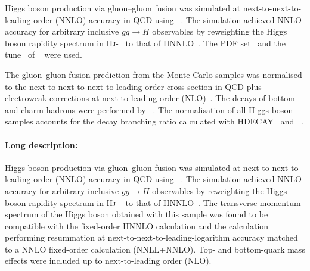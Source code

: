 Higgs boson production via gluon--gluon fusion was simulated at next-to-next-to-leading-order (NNLO) accuracy in 
QCD using \POWHEGBOX[v2]~\cite{Hamilton:2013fea,Hamilton:2015nsa,Alioli:2010xd,Nason:2004rx,Frixione:2007vw}. 
The simulation achieved NNLO accuracy for arbitrary inclusive $gg\to H$ observables by reweighting the Higgs boson 
rapidity spectrum in \textsc{Hj}-\MINLO~\cite{Hamilton:2012np,Campbell:2012am,Hamilton:2012rf} to that of HNNLO~\cite{Catani:2007vq}.
The \PDFforLHC[15nnlo] PDF set~\cite{Butterworth:2015oua} and the \AZNLO tune~\cite{STDM-2012-23} 
of \PYTHIA[8]~\cite{Sjostrand:2014zea} were used.

The gluon--gluon fusion prediction from the Monte Carlo samples was normalised to the 
next-to-next-to-next-to-leading-order cross-section in QCD plus electroweak corrections 
at next-to-leading order 
(NLO)~\cite{deFlorian:2016spz,Anastasiou:2016cez,Anastasiou:2015ema,Dulat:2018rbf,Harlander:2009mq,Harlander:2009bw,Harlander:2009my,Pak:2009dg,Actis:2008ug,Actis:2008ts,Bonetti:2018ukf,Bonetti:2018ukf}. The decays of bottom and charm hadrons
were performed by \EVTGEN~\cite{Lange:2001uf}.
The normalisation of all Higgs boson
samples accounts for the decay branching ratio calculated with HDECAY~\cite{Djouadi:1997yw,Spira:1997dg,Djouadi:2006bz}
and \PROPHECY~\cite{Bredenstein:2006ha,Bredenstein:2006rh,Bredenstein:2006nk}.


\paragraph{Long description:}

Higgs boson production via gluon--gluon fusion was simulated at next-to-next-to-leading-order (NNLO) accuracy in QCD using 
\POWHEGBOX[v2]~\cite{Hamilton:2013fea,Hamilton:2015nsa,Alioli:2010xd,Nason:2004rx,Frixione:2007vw}. The simulation achieved NNLO
accuracy for arbitrary inclusive $gg\to H$ observables by reweighting the Higgs boson rapidity spectrum 
in \textsc{Hj}-\MINLO~\cite{Hamilton:2012np,Campbell:2012am,Hamilton:2012rf} to that of HNNLO~\cite{Catani:2007vq}. The transverse momentum
spectrum of the Higgs boson obtained with this sample was found to be compatible with the fixed-order HNNLO calculation and the
\HRES[2.3] calculation~\cite{Bozzi:2005wk,deFlorian:2011xf} performing resummation at next-to-next-to-leading-logarithm accuracy
matched to a NNLO fixed-order calculation (NNLL+NNLO). 
Top- and bottom-quark mass effects were included up to next-to-leading order (NLO).

